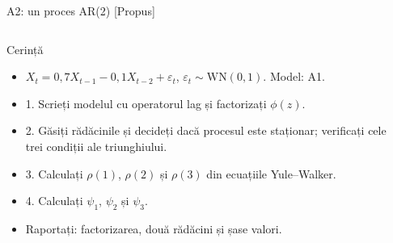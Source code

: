 \begin{frame}{A2: un proces AR(2) [Propus]}
\propsub
\itemsize{\scriptsize}
\begin{columns}[T]
\begin{column}{\taskw}
\begin{block}{Cerință}
\begin{itemize}
    \item $X_t = 0{,}7X_{t-1} - 0{,}1X_{t-2} + \varepsilon_t$, $\varepsilon_t \sim \mathrm{WN}(0, 1)$. Model: A1.
    \item 1. Scrieți modelul cu operatorul lag și factorizați $\phi(z)$.
    \item 2. Găsiți rădăcinile și decideți dacă procesul este staționar; verificați cele trei condiții ale triunghiului.
    \item 3. Calculați $\rho(1)$, $\rho(2)$ și $\rho(3)$ din ecuațiile Yule--Walker.
    \item 4. Calculați $\psi_1$, $\psi_2$ și $\psi_3$.
    \item Raportați: factorizarea, două rădăcini și șase valori.
\end{itemize}
\end{block}
\end{column}
\begin{column}{\solw}
\end{column}
\end{columns}
\end{frame}

